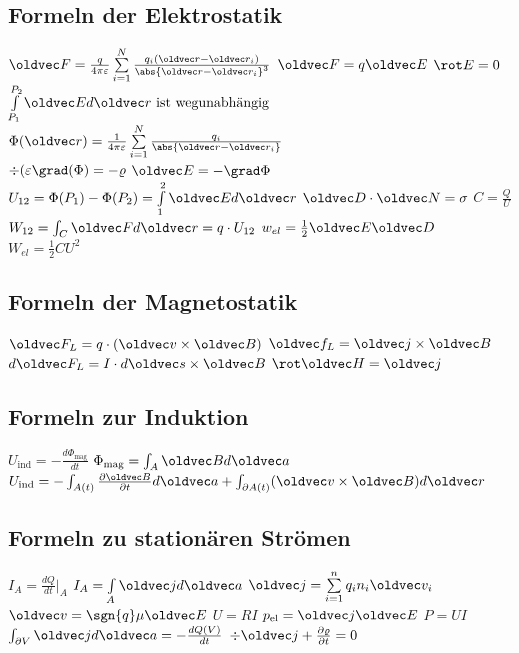 \documentclass[6pt,a4paper]{scrartcl}
\let\vec\oldvec
\begin{document}
\begin{multicols}{4}
\subsection{Formeln der Elektrostatik}
$ \vec F = \frac{q}{4 \pi \varepsilon} \sum \limits_{i = 1}^N \frac{q_i (\vec r - \vec r_i )}{\abs{\vec r - \vec r_i}^3}$ \quad $\vec F = q \vec E$ \quad $\rot E = 0$ \\
$ \int \limits_{P_1}^{P_2} \vec E d \vec r \text{ ist wegunabhängig}$ \quad $\Phi (\vec r) = \frac{1}{4 \pi \varepsilon} \sum \limits_{i =1}^{N} \frac{q_i}{\abs{\vec r - \vec r_i}}$ \\
$\div(\varepsilon \grad(\Phi) = - \varrho$ \quad $\vec E = -\grad \Phi$ \\
 $U_{12} = \Phi (P_1) - \Phi (P_2) = \int \limits_1^2 \vec E d\vec r$ \quad $\vec D \cdot \vec N = \sigma$ \quad $C = \frac{Q}{U}$ \\
$W_{12} = \int_C \vec F d \vec r = q \cdot U_{12}$ \quad $w_{el} = \frac{1}{2} \vec E \vec D$ \quad $W_{el} = \frac{1}{2} C U^2$


\subsection{Formeln der Magnetostatik}
$\vec F_L = q \cdot (\vec v \times \vec B)$ \quad $\vec f_L = \vec j \times \vec B$ \quad $d \vec F_L = I \cdot d\vec s  \times \vec B$ \quad $\rot \vec H = \vec j$

\subsection{Formeln zur Induktion}
$U_{\text{ind}} = - \frac{d \Phi_{\text{mag}}}{dt}$ \quad $\Phi_{\text{mag}} = \int_A \vec B d \vec a$ \\
$U_{\text{ind}} = - \int_{A(t)} \frac{\partial \vec B}{\partial t} d \vec a + \int_{\partial A(t)} (\vec v \times \vec B) d \vec r$

\subsection{Formeln zu stationären Strömen}
$I_A = \frac{d Q}{d t} |_A$ \quad $I_A = \int \limits_A \vec j d \vec a$ \quad $\vec j = \sum \limits_{i = 1}^n q_i n_i \vec v_i$ \\
$\vec v = \sgn{q} \mu \vec E$ \quad $U = R I$ \quad $p_{\text{el}} = \vec j \vec E$ \quad $P = UI$ \\
$\int_{\partial V} \vec j d \vec a  = - \frac{d Q(V)}{dt}$ \quad $\div \vec j + \frac{\partial \varrho}{\partial t} = 0$




\end{multicols}
\end{document}
